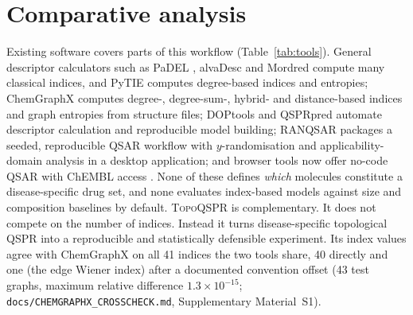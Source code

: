 \documentclass[preprint,12pt]{elsarticle}
\newcommand{\ml}{\textsc{TopoQSPR}}
\begin{document}
\section{Comparative analysis}\label{sec:comparison}
Existing software covers parts of this workflow (Table~\ref{tab:tools}). General descriptor calculators such as PaDEL \cite{yap2011padel}, alvaDesc \cite{mauri2020alvadesc} and Mordred \cite{moriwaki2018mordred} compute many classical indices, and PyTIE \cite{jeyaraj2025pytie} computes degree-based indices and entropies; ChemGraphX \cite{jacob2026chemgraphx} computes degree-, degree-sum-, hybrid- and distance-based indices and graph entropies from structure files; DOPtools \cite{byadi2025doptools} and QSPRpred \cite{vandenmaagdenberg2024qsprpred} automate descriptor calculation and reproducible model building; RANQSAR \cite{thakur2026ranqsar} packages a seeded, reproducible QSAR workflow with $y$-randomisation and applicability-domain analysis in a desktop application; and browser tools now offer no-code QSAR with ChEMBL access \cite{masud2026browser}. None of these defines \emph{which} molecules constitute a disease-specific drug set, and none evaluates index-based models against size and composition baselines by default. \ml{} is complementary. It does not compete on the number of indices. Instead it turns disease-specific topological QSPR into a reproducible and statistically defensible experiment. Its index values agree with ChemGraphX on all 41 indices the two tools share, 40 directly and one (the edge Wiener index) after a documented convention offset (43 test graphs, maximum relative difference $1.3\times10^{-15}$; \texttt{docs/CHEMGRAPHX\_CROSSCHECK.md}, Supplementary Material~S1).
\end{document}
